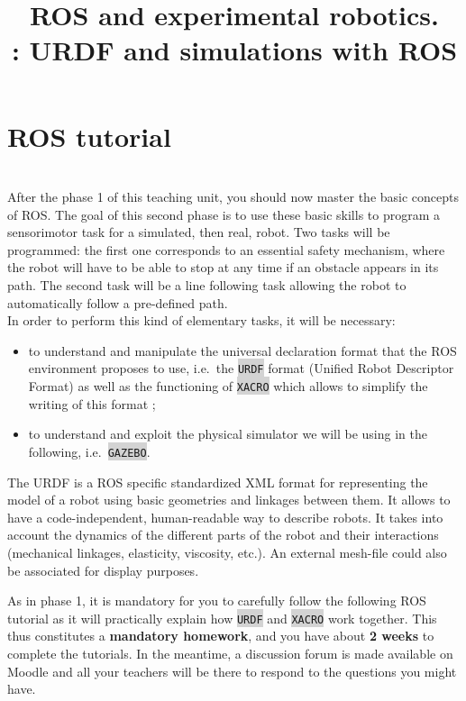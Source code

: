 \documentclass[10pt,a4paper]{upmc}
\title{ROS and experimental robotics.\\ \Num: URDF and simulations with ROS}
\newcommand{\myline}{\noindent\makebox[\linewidth]{\rule{\textwidth}{0.7pt}}}
\newcommand{\mytext}[1]{\colorbox{lightgray}{\texttt{#1}}}
\begin{document}
\maketitle


\section{ROS tutorial}
\label{sec:tutorial}
\vspace{-0.5cm}\myline\\
After the phase 1 of this teaching unit, you should now master the basic concepts of ROS. The goal
of this second phase is to use these basic skills to program a sensorimotor task for a simulated,
then real, robot. Two tasks will be programmed: the first one corresponds to an essential safety
mechanism, where the robot will have to be able to stop at any time if an obstacle appears in its
path. The second task will be a line following task allowing the robot to automatically follow a
pre-defined path. \\

\noindent In order to perform this kind of elementary tasks, it will be necessary:
\begin{itemize}
  \item to understand and manipulate the universal declaration format that the ROS environment
        proposes to use, i.e.\ the \mytext{URDF} format (Unified Robot Descriptor Format) as well as
        the functioning of \mytext{XACRO} which allows to simplify the writing of this format ;
  \item to understand and exploit the physical simulator we will be using in the following, i.e.\
        \mytext{GAZEBO}.
\end{itemize}
%
\begin{mdframed}[style=graybox]
  The URDF is a ROS specific standardized XML format for representing the model of a robot using
  basic geometries and linkages between them. It allows to have a code-independent, human-readable
  way to describe robots. It takes into account the dynamics of the different parts of the robot and
  their interactions (mechanical linkages, elasticity, viscosity, etc.). An external mesh-file could
  also be associated for display purposes.
\end{mdframed}

As in phase 1, it is mandatory for you to carefully follow the following ROS tutorial as it will
practically explain how \mytext{URDF} and \mytext{XACRO} work together. This thus constitutes a
\textbf{mandatory homework}, and you have about \textbf{2 weeks} to complete the tutorials. In the
meantime, a discussion forum is made available on Moodle and all your teachers will be there to
respond to the questions you might have. \\
\end{document}
